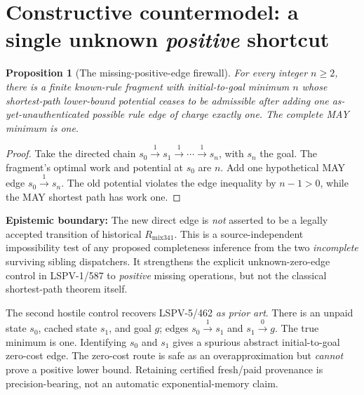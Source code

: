\documentclass[11pt]{article}
\newtheorem{proposition}{Proposition}
\begin{document}
\section*{Constructive countermodel: a single unknown \emph{positive} shortcut}
\begin{proposition}[The missing-positive-edge firewall]
For every integer \(n\ge2\), there is a finite known-rule fragment with
initial-to-goal minimum \(n\) whose shortest-path lower-bound potential
ceases to be admissible after adding \emph{one} as-yet-unauthenticated
possible rule edge of charge exactly one. The complete MAY minimum is one.
\end{proposition}
\begin{proof}
Take the directed chain
\(s_0\xrightarrow{1}s_1\xrightarrow{1}\cdots\xrightarrow{1}s_n\),
with \(s_n\) the goal. The fragment's optimal work and potential at \(s_0\)
are \(n\). Add one hypothetical MAY edge
\(s_0\xrightarrow{1}s_n\). The old potential violates the edge
inequality by \(n-1>0\), while the MAY shortest path has work one.
\end{proof}
\noindent\textbf{Epistemic boundary:} The new direct edge is
\emph{not} asserted to be a legally accepted transition of historical
\(R_{\mathrm{mix341}}\). This is a source-independent impossibility test of
any proposed completeness inference from the two \emph{incomplete}
surviving sibling dispatchers. It strengthens the explicit unknown-zero-edge
control in LSPV-1/587 to \emph{positive} missing operations, but
not the classical shortest-path theorem itself.

The second hostile control recovers LSPV-5/462 \emph{as prior art}.
There is an unpaid state \(s_0\), cached state \(s_1\), and goal \(g\);
edges \(s_0\xrightarrow{1}s_1\) and \(s_1\xrightarrow{0}g\).
The true minimum is one. Identifying \(s_0\) and \(s_1\) gives a
spurious abstract initial-to-goal zero-cost edge. The zero-cost
route is safe as an overapproximation but \emph{cannot} prove a
positive lower bound. Retaining certified fresh/paid provenance is
precision-bearing, not an automatic exponential-memory claim.
\end{document}
